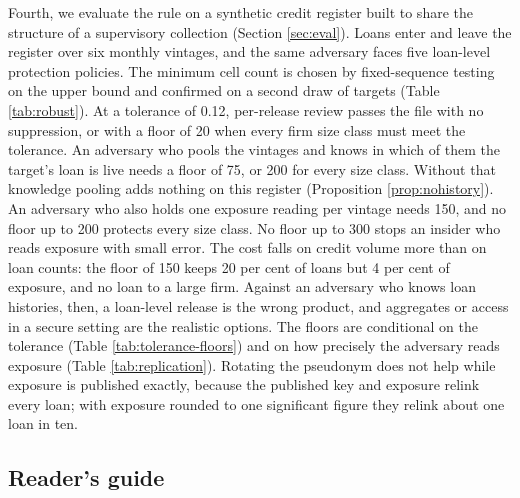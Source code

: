 \documentclass[11pt,a4paper]{article}
\theoremstyle{plain}
\theoremstyle{definition}
\theoremstyle{definition}
\theoremstyle{plain}
\begin{document}
Fourth, we evaluate the rule on a synthetic credit register built to share the
structure of a supervisory collection (Section \ref{sec:eval}). Loans enter and
leave the register over six monthly vintages, and the same adversary faces five
loan-level protection policies. The minimum cell count is chosen by
fixed-sequence testing on the upper bound and confirmed on a second draw of
targets (Table \ref{tab:robust}). At a tolerance of 0.12, per-release review
passes the file with no suppression, or with a floor of 20 when every firm size
class must meet the tolerance. An adversary who pools the vintages and knows in
which of them the target's loan is live needs a floor of 75, or 200 for every
size class. Without that knowledge pooling adds nothing on this register
(Proposition \ref{prop:nohistory}). An adversary who also holds one exposure
reading per vintage needs 150, and no floor up to 200 protects every size class.
No floor up to 300 stops an insider who reads exposure with small error. The cost
falls on credit volume more than on loan counts: the floor of 150 keeps 20 per
cent of loans but 4 per cent of exposure, and no loan to a large firm. Against an
adversary who knows loan histories, then, a loan-level release is the wrong
product, and aggregates or access in a secure setting are the realistic options.
The floors are conditional on the tolerance (Table \ref{tab:tolerance-floors})
and on how precisely the adversary reads exposure (Table \ref{tab:replication}).
Rotating the pseudonym does not help while exposure is published exactly,
because the published key and exposure relink every loan; with exposure rounded
to one significant figure they relink about one loan in ten.

\subsection{Reader's guide}
\end{document}
